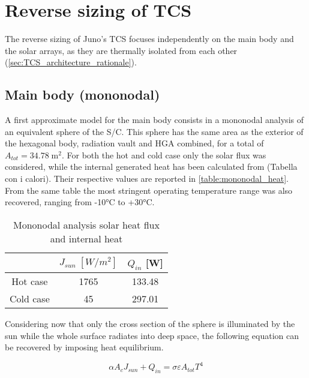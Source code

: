 \pagebreak
\section{Reverse sizing of TCS}
\label{sec:TCS_sizing}

The reverse sizing of Juno's TCS focuses independently on the main body and the solar arrays, as they are thermally isolated from each other (\autoref{sec:TCS_architecture_rationale}). 

\subsection{Main body (mononodal)}
\label{subsec:mb_mono_sizing}

A first approximate model for the main body consists in a mononodal analysis of an equivalent sphere of the S/C. This sphere has the same area as the exterior of the hexagonal body, radiation vault and HGA combined, for a total of $A_{tot} = 34.78 \; \textrm{m}^2$. For both the hot and cold case only the solar flux was considered, while the internal generated heat has been calculated from \mref (Tabella con i calori). Their respective values are reported in \autoref{table:mononodal_heat}. From the same table the most stringent operating temperature range was also recovered, ranging from -10°C to +30°C. 
\begin{table}[H]
    \renewcommand{\arraystretch}{1.3}
    \centering
    \begin{tabular}{|c|c|c|}
        \hline
        & $J_{sun} \; [W/m^2]$ & $Q_{in}$ [W] \\
        \hline
        \hline
        Hot case & 1765 & 133.48 \\
        \hline
        Cold case & 45 & 297.01 \\ 
        \hline
    \end{tabular}
    \caption{Mononodal analysis solar heat flux and internal heat}
    \label{table:mononodal_heat}
\end{table}

Considering now that only the cross section of the sphere is illuminated by the sun while the whole surface radiates into deep space, the following equation can be recovered by imposing heat equilibrium.

\begin{equation}
    \alpha A_c J_{sun} + Q_{in} = \sigma \varepsilon A_{tot} T^4
    \label{eq:heat_equlibrium}
\end{equation}  

